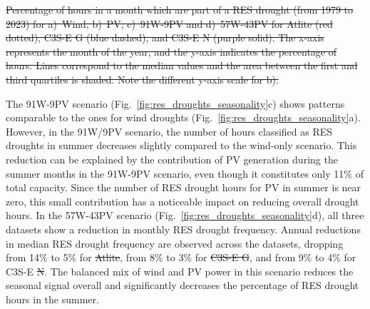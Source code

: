 \documentclass[preprint, 12pt]{elsarticle}
\providecommand{\DIFadd}[1]{{\protect\color{blue}\uwave{#1}}} %
\providecommand{\DIFdel}[1]{{\protect\color{red}\sout{#1}}}                      %
\providecommand{\DIFaddbegin}{} %
\providecommand{\DIFaddend}{} %
\providecommand{\DIFdelbegin}{} %
\providecommand{\DIFdelend}{} %
\providecommand{\DIFdelFL}[1]{\DIFdel{#1}} %
\begin{document}
\DIFdelbegin %
{%
\DIFdelFL{Percentage of hours in a month which are part of a RES drought (from 1979 to 2023) for a)~Wind, b)~PV, c)~91W-9PV and d)~57W-43PV for Atlite (red dotted), C3S-E G (blue dashed), and C3S-E N (purple solid). The x-axis represents the month of the year, and the y-axis indicates the percentage of hours. Lines correspond to the median values and the area between the first and third quartiles is shaded. Note the different y-axis scale for b).}}

\DIFdelend The 91W-9PV scenario (Fig.~\ref{fig:res_droughts_seasonality}c) shows patterns comparable to the ones for wind droughts (Fig.~\ref{fig:res_droughts_seasonality}a). However, in the 91W/9PV scenario, the number of hours classified as RES droughts in summer decreases slightly compared to the wind-only scenario. This reduction can be explained by the contribution of \DIFaddbegin \DIFadd{solar }\DIFaddend PV generation during the summer months in the 91W-9PV scenario, even though it constitutes only 11\% of total capacity. Since the number of RES drought hours for \DIFaddbegin \DIFadd{solar }\DIFaddend PV in summer is near zero, this small contribution has a noticeable impact on reducing overall drought hours. In the 57W-43PV scenario (Fig.~\ref{fig:res_droughts_seasonality}d), all three datasets show a reduction in monthly RES drought frequency. Annual reductions in median RES drought frequency are observed across the datasets, dropping from 14\% to 5\% for \DIFdelbegin \DIFdel{Atlite}\DIFdelend \DIFaddbegin \DIFadd{ATL}\DIFaddend , from 8\% to 3\% for \DIFdelbegin \DIFdel{C3S-E G}\DIFdelend \DIFaddbegin \DIFadd{C3S GRD}\DIFaddend , and from 9\% to 4\% for C3S-E \DIFdelbegin \DIFdel{N}\DIFdelend \DIFaddbegin \DIFadd{NAT}\DIFaddend . The balanced mix of wind and \DIFaddbegin \DIFadd{solar }\DIFaddend PV power in this scenario reduces the seasonal signal overall and significantly decreases the percentage of RES drought hours in the summer.
\end{document}
